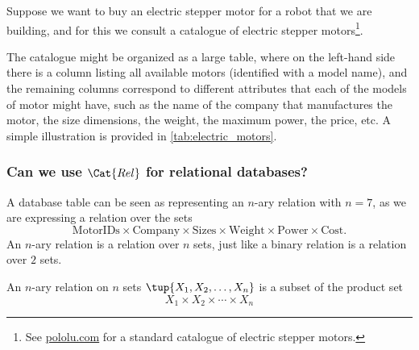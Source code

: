 Suppose we want to buy an electric stepper motor for a robot that we are building, and for this we consult a catalogue of electric stepper motors\footnote{See \href{https://www.pololu.com/category/87/stepper-motors}{pololu.com} for a standard catalogue of electric stepper motors.}. 

The catalogue might be organized as a large table, where on the left-hand side there is a column listing all available motors (identified with a model name), and the remaining columns correspond to different attributes that each of the models of motor might have, such as the name of the company that manufactures the motor, the size dimensions, the weight, the maximum power, the price, etc. A simple illustration is provided in \cref{tab:electric_motors}.

\begin{table}[h]
    \centering
    \caption{A simplified catalogue of motors.}
    \label{tab:electric_motors}
\end{table}


\subsubsection{Can we use $\Cat{Rel}$ for relational databases?}

A database table can be seen as representing an $n$-ary relation with $n = 7$, as we are expressing a relation
over the sets 
$$
    \text{MotorIDs} \times \text{Company} 
    \times \text{Sizes} \times \text{Weight} \times \text{Power} \times \text{Cost}.
$$
An $n$-ary relation is a relation over $n$ sets, just like a binary relation is a
relation over $2$ sets.
\begin{definition}
An $n$-ary relation on $n$ sets $\tup{X_1, X_2, \dots, X_n}$ is a
subset of the product set 
\begin{equation}
X_1 \times X_2 \times \cdots \times X_n
\end{equation}
\end{definition}

